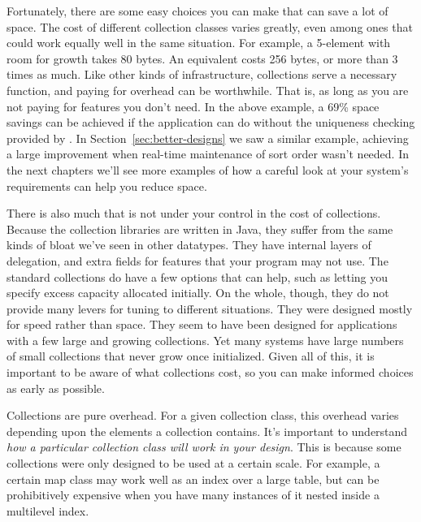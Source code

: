 

Fortunately, there are some easy choices you can make that
can save a lot of space. The cost of different
collection classes varies greatly, even among ones that could work equally well
in the same situation. For example, a 5-element  with room for growth takes 80 bytes. 
An equivalent  costs 256 bytes,
or more than 3 times as much. Like other kinds of infrastructure, collections
serve a necessary function, and paying for overhead can be worthwhile. That is, as long as you are not
paying for features you don't need. In the above example, a
69\% space savings can be achieved if the application can do without the
uniqueness checking provided by .  In
Section~\ref{sec:better-designs} we saw a similar example, achieving a large
improvement when real-time
maintenance of sort order wasn't needed. In the next chapters we'll see more
examples of how a careful look at your system's
requirements can help you reduce space.

There is also much that is not under your control in the cost
of collections.
Because the collection libraries are written in Java, they suffer
from the same kinds of bloat we've seen in other datatypes. They have
internal layers of delegation, and extra fields for features that your program may not use. The standard
collections do have a few options that can help, such as
letting you specify excess capacity allocated initially. On the
whole, though, they do not provide many levers for tuning to different situations. They were
designed mostly for speed rather than space.  They seem to have been designed
for applications with a few large and growing collections. Yet many systems have large numbers
of small collections that never grow once initialized. Given all of this, it is important
to be aware of what collections cost, so you can make informed choices as early as possible. 

Collections are pure overhead. For a given collection class, this overhead
varies depending upon the elements a collection contains. 
It's important to understand \emph{how a particular collection class will work
in your design}.
This is because some collections were only designed to be used at a certain scale. 
For example, a certain map class may work
well as an index over a large table, but can be prohibitively expensive when you
have many instances of it nested inside a multilevel index. 

